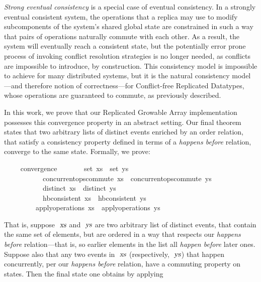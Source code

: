 \documentclass[acmlarge,review,anonymous]{acmart}\settopmatter{printfolios=true}
\begin{document}
\emph{Strong eventual consistency} is a special case of eventual consistency.
In a strongly eventual consistent system, the operations that a replica may use to modify subcomponents of the system's shared global state are constrained in such a way that pairs of operations naturally commute with each other.
As a result, the system will eventually reach a consistent state, but the potentially error prone process of invoking conflict resolution strategies is no longer needed, as conflicts are impossible to introduce, by construction.
This consistency model is impossible to achieve for many distributed systems, but it is the natural consistency model---and therefore notion of correctness---for Conflict-free Replicated Datatypes, whose operations are guaranteed to commute, as previously described.

In this work, we prove that our Replicated Growable Array implementation possesses this convergence property in an abstract setting.
Our final theorem states that two arbitrary lists of distinct events enriched by an order relation, that satisfy a consistency property defined in terms of a \emph{happens before} relation, converge to the same state.
Formally, we prove:
\\
\begin{isabellebody}
\ \ \ \  convergence{\isacharcolon}\isanewline
\ \ \ \ \ \ \ {\isachardoublequoteopen}set\ xs\ {\isacharequal}\ set\ ys{\isachardoublequoteclose}\isanewline
\ \ \ \ \ \ \ \ \ \ \ {\isachardoublequoteopen}concurrent{\isacharunderscore}ops{\isacharunderscore}commute\ xs{\isachardoublequoteclose}\ \ {\isachardoublequoteopen}concurrent{\isacharunderscore}ops{\isacharunderscore}commute\ ys{\isachardoublequoteclose}\isanewline
\ \ \ \ \ \ \ \ \ \ \ {\isachardoublequoteopen}distinct\ xs{\isachardoublequoteclose}\ \ {\isachardoublequoteopen}distinct\ ys{\isachardoublequoteclose}\isanewline
\ \ \ \ \ \ \ \ \ \ \ {\isachardoublequoteopen}hb{\isacharunderscore}consistent\ xs{\isachardoublequoteclose}\ \ {\isachardoublequoteopen}hb{\isacharunderscore}consistent\ ys{\isachardoublequoteclose}\isanewline
\ \ \ \ \ \ \ \ \ {\isachardoublequoteopen}apply{\isacharunderscore}operations\ xs\ {\isacharequal}\ apply{\isacharunderscore}operations\ ys{\isachardoublequoteclose}\isanewline
\end{isabellebody}
That is, suppose $\isa{xs}$ and $\isa{ys}$ are two arbitrary list of distinct events, that contain the same set of elements, but are ordered in a way that respects our \emph{happens before} relation---that is, so earlier elements in the list all \emph{happen before} later ones.
Suppose also that any two events in $\isa{xs}$ (respectively, $\isa{ys}$) that happen concurrently, per our \emph{happens before} relation, have a commuting property on states.
Then the final state one obtains by applying
\end{document}
